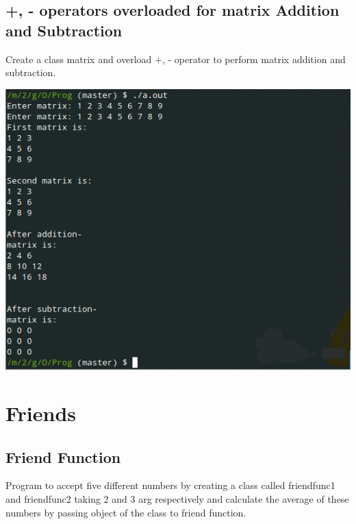 \documentclass[oneside, a4paper,11pt]{book}
\begin{document}
\section{+, - operators overloaded for matrix Addition and Subtraction}

Create a class matrix and overload +, - operator to perform matrix addition and subtraction.


\includegraphics[width=\textwidth]{q9.png}



% 

\chapter{Friends}
\section{Friend Function}

Program to accept five different numbers by creating a class called friendfunc1 and friendfunc2 taking 2 and 3 arg respectively and calculate the average of these numbers by passing object of the class to friend function.
\end{document}
